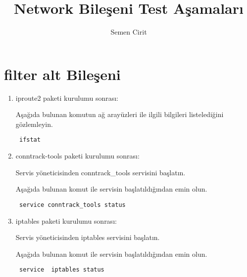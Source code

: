 \documentclass[a4paper,10pt]{article}
\title{Network Bileşeni Test Aşamaları}
\author{Semen Cirit}
\begin{document}
\maketitle
\section{filter alt Bileşeni}
\begin{enumerate}
 \item iproute2 paketi kurulumu sonrası:

Aşağıda bulunan komutun ağ arayüzleri ile ilgili bilgileri listelediğini gözlemleyin. 
\begin{verbatim}
 ifstat
\end{verbatim}
\item conntrack-tools paketi kurulumu sonrası:

Servis yöneticisinden conntrack\_tools servisini başlatın.

Aşağıda bulunan komut ile servisin başlatıldığından emin olun.
\begin{verbatim}
 service conntrack_tools status
\end{verbatim}
\item iptables paketi kurulumu sonrası:

Servis yöneticisinden iptables servisini başlatın.

Aşağıda bulunan komut ile servisin başlatıldığından emin olun.
\begin{verbatim}
 service  iptables status
\end{verbatim}
\end{enumerate}
\end{document}
